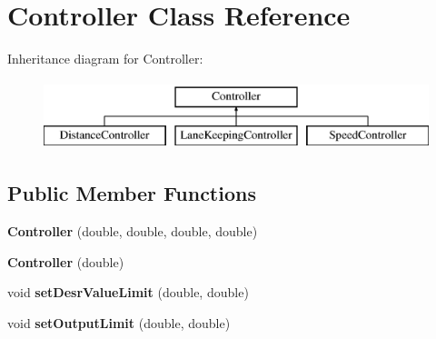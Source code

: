 \hypertarget{class_controller}{}\section{Controller Class Reference}
\label{class_controller}
Inheritance diagram for Controller\+:\begin{figure}[H]
\begin{center}
\leavevmode
\includegraphics[height=2.000000cm]{class_controller}
\end{center}
\end{figure}
\subsection*{Public Member Functions}
\begin{DoxyCompactItemize}
\item 
\mbox{\label{class_controller_a75a8a76b9188d0ea653dcfbe072f728f}} 
{\bfseries Controller} (double, double, double, double)
\item 
\mbox{\label{class_controller_a9b2eac1cf2c6cd8de25fbe06ab76d9ec}} 
{\bfseries Controller} (double)
\item 
\mbox{\label{class_controller_ac1297a71ed6fee7f14d53c7d075770db}} 
void {\bfseries set\+Desr\+Value\+Limit} (double, double)
\item 
\mbox{\label{class_controller_ae208ecde3f2bbabcefd5b5fd1a07f665}} 
void {\bfseries set\+Output\+Limit} (double, double)
\end{DoxyCompactItemize}
